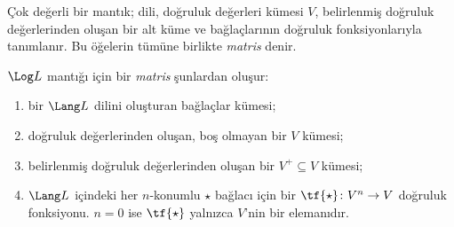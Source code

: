 \documentclass[../../../include/open-logic-section]{subfiles}
\begin{document}


Çok değerli bir mantık; dili, doğruluk değerleri kümesi $V$, belirlenmiş
doğruluk değerlerinden oluşan bir alt küme ve bağlaçlarının doğruluk
fonksiyonlarıyla tanımlanır. Bu öğelerin tümüne birlikte \emph{matris} denir.

\begin{defn}[Matris]
$\Log L$ mantığı için bir \emph{matris} şunlardan oluşur:
\begin{enumerate}
\item bir $\Lang L$ dilini oluşturan bağlaçlar kümesi;
\item doğruluk değerlerinden oluşan, boş olmayan bir $V$ kümesi;
\item belirlenmiş doğruluk değerlerinden oluşan bir $V^+\subseteq V$ kümesi;
\item $\Lang L$ içindeki her $n$-konumlu $\star$ bağlacı için bir
  $\tf{\star}\colon V^n\to V$ doğruluk fonksiyonu. $n=0$ ise
  $\tf{\star}$ yalnızca $V$'nin bir elemanıdır.
\end{enumerate}
\end{defn}
\end{document}
